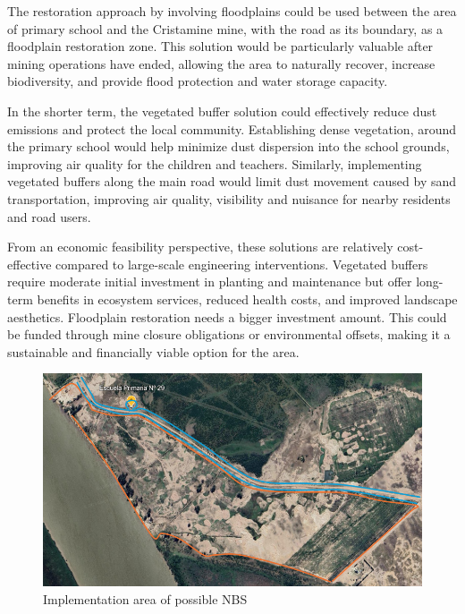 The restoration approach by involving floodplains could be used between the area of primary school and the Cristamine mine, with the road as its boundary, as a floodplain restoration zone. This solution would be particularly valuable after mining operations have ended, allowing the area to naturally recover, increase biodiversity, and provide flood protection and water storage capacity.

In the shorter term, the vegetated buffer solution could effectively reduce dust emissions and protect the local community. Establishing dense vegetation, around the primary school would help minimize dust dispersion into the school grounds, improving air quality for the children and teachers.
Similarly, implementing vegetated buffers along the main road would limit dust movement caused by sand transportation, improving air quality, visibility and nuisance for nearby residents and road users.

From an economic feasibility perspective, these solutions are relatively cost-effective compared to large-scale engineering interventions. Vegetated buffers require moderate initial investment in planting and maintenance but offer long-term benefits in ecosystem services, reduced health costs, and improved landscape aesthetics. Floodplain restoration needs a bigger investment amount. This could be funded through mine closure obligations or environmental offsets, making it a sustainable and financially viable option for the area.

\begin{figure}[H]
    \centering
    \includegraphics[width=0.75\linewidth]{figures//ch8/omgevingschooltje2.png}
    \caption{Implementation area of possible NBS}
    \label{fig:PAI}
\end{figure}